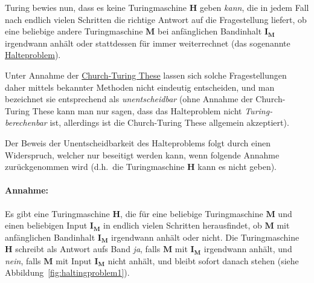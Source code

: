 Turing bewies nun, dass es keine Turingmaschine $\mathbf{H}$ geben \emph{kann}, die in jedem Fall nach endlich vielen Schritten die richtige Antwort auf die Fragestellung liefert, ob eine beliebige andere Turingmaschine $\mathbf{M}$ bei anf\"{a}nglichen Bandinhalt $\mathbf{I_M}$ irgendwann anh\"{a}lt oder stattdessen f\"{u}r immer weiterrechnet (das sogenannte \href{http://de.wikipedia.org/wiki/Halteproblem}{Halteproblem}).

Unter Annahme der \href{http://de.wikipedia.org/wiki/Church-Turing-These}{Church-Turing These} lassen sich solche Fragestellungen daher mittels bekannter Methoden nicht eindeutig entscheiden, und man bezeichnet sie entsprechend als \emph{unentscheidbar} (ohne Annahme der Church-Turing These kann man nur sagen, dass das Halteproblem nicht \emph{Turing-berechenbar} ist, allerdings ist die Church-Turing These allgemein akzeptiert).

Der Beweis der Unentscheidbarkeit des Halteproblems folgt durch einen Widerspruch, welcher nur beseitigt werden kann, wenn folgende Annahme zur\"{u}ckgenommen wird (d.h.\ die Turingmaschine $\mathbf{H}$ kann es nicht geben).

\paragraph{Annahme:} Es gibt eine Turingmaschine $\mathbf{H}$, die f\"{u}r eine beliebige Turingmaschine $\mathbf{M}$ und einen beliebigen Input $\mathbf{I_M}$ in endlich vielen Schritten herausfindet, ob $\mathbf{M}$ mit anf\"{a}nglichen Bandinhalt $\mathbf{I_M}$ irgendwann anh\"{a}lt oder nicht. Die Turingmaschine $\mathbf{H}$ schreibt als Antwort aufs Band \emph{ja}, falls $\mathbf{M}$ mit $\mathbf{I_M}$ irgendwann anh\"{a}lt, und \emph{nein}, falls $\mathbf{M}$ mit Input $\mathbf{I_M}$ nicht anh\"{a}lt, und bleibt sofort danach stehen (siehe Abbildung~\ref{fig:haltingproblem1}).

